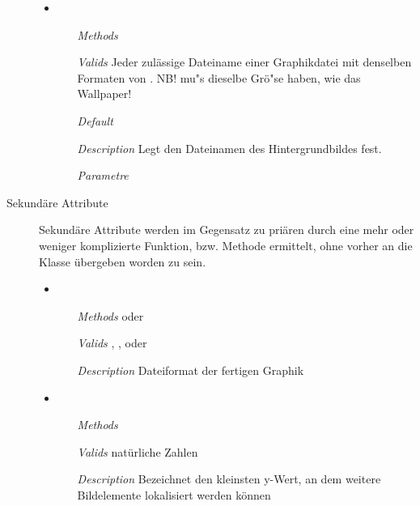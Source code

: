 \begin{description}
\begin{itemize}
\item {}
\begin{enumerate}
\item[\textit{Methods}] 
\item[\textit{Valids}] Jeder zul\"assige Dateiname einer Graphikdatei
  mit denselben Formaten von .  NB!
   mu"s dieselbe Gr\"o"se haben, wie das Wallpaper!
\item[\textit{Default}] 
\item[\textit{Description}] Legt den Dateinamen des Hintergrundbildes
  fest.
\item[\textit{Parametre}] 
\end{enumerate}

\end{itemize}


\newpage

\item[Sekund\"are Attribute] Sekund\"are Attribute werden im Gegensatz
  zu pri\"aren durch eine mehr oder weniger komplizierte Funktion,
  bzw. Methode ermittelt, ohne vorher an die Klasse \"ubergeben worden
  zu sein.


\begin{itemize}
\item {}
\begin{enumerate}
\item[\textit{Methods}]   oder 
\item[\textit{Valids}] , ,
   oder 
\item[\textit{Description}] Dateiformat der fertigen Graphik
\end{enumerate}

\item {}
\begin{enumerate}
\item[\textit{Methods}] 
\item[\textit{Valids}] nat\"urliche Zahlen
\item[\textit{Description}] Bezeichnet den kleinsten y-Wert, an dem
  weitere Bildelemente lokalisiert werden k\"onnen
\end{enumerate}


\end{itemize}
\end{description}

